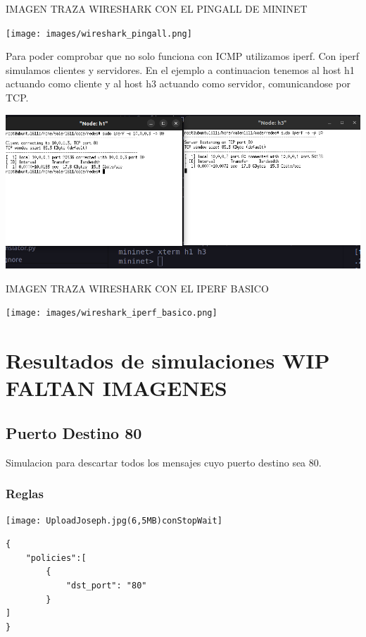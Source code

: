 \documentclass{article}
\begin{document}
IMAGEN TRAZA WIRESHARK CON EL PINGALL DE MININET
\begin{center}
\texttt{[image: images/wireshark\_pingall.png]}
\end{center}


Para poder comprobar que no solo funciona con ICMP utilizamos iperf. Con iperf simulamos
clientes y servidores. En el ejemplo a continuacion tenemos al host h1 actuando como cliente
y al host h3 actuando como servidor, comunicandose por TCP.

\begin{center}
\includegraphics[scale=0.37]{images/mininet_iperf_basico.png}
\end{center}

IMAGEN TRAZA WIRESHARK CON EL IPERF BASICO
\begin{center}
\texttt{[image: images/wireshark\_iperf\_basico.png]}
\end{center}

\newpage
\section{\texorpdfstring{\textbf{Resultados de simulaciones WIP FALTAN IMAGENES}}{Resultados de simulaciones}}\label{pruebas-wip}

\subsection{Puerto Destino 80}
Simulacion para descartar todos los mensajes cuyo puerto destino sea 80.

\subsubsection{Reglas}
\begin{center}
\texttt{[image: UploadJoseph.jpg(6,5MB)conStopWait]}
\end{center}

\begin{verbatim}
{
    "policies":[
        {
            "dst_port": "80"
        }
]
}
\end{verbatim}
\end{document}
